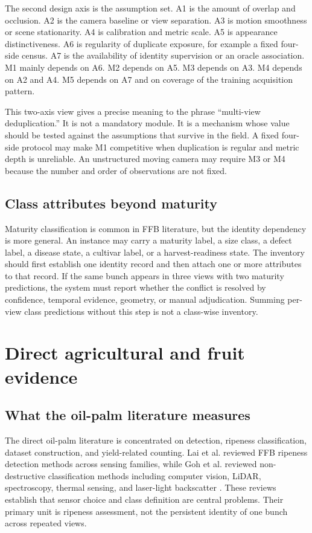 The second design axis is the assumption set. A1 is the amount of overlap and occlusion. A2 is the camera baseline or view separation. A3 is motion smoothness or scene stationarity. A4 is calibration and metric scale. A5 is appearance distinctiveness. A6 is regularity of duplicate exposure, for example a fixed four-side census. A7 is the availability of identity supervision or an oracle association. M1 mainly depends on A6. M2 depends on A5. M3 depends on A3. M4 depends on A2 and A4. M5 depends on A7 and on coverage of the training acquisition pattern.

This two-axis view gives a precise meaning to the phrase ``multi-view deduplication.'' It is not a mandatory module. It is a mechanism whose value should be tested against the assumptions that survive in the field. A fixed four-side protocol may make M1 competitive when duplication is regular and metric depth is unreliable. An unstructured moving camera may require M3 or M4 because the number and order of observations are not fixed.

\subsection{Class attributes beyond maturity}

Maturity classification is common in FFB literature, but the identity dependency is more general. An instance may carry a maturity label, a size class, a defect label, a disease state, a cultivar label, or a harvest-readiness state. The inventory should first establish one identity record and then attach one or more attributes to that record. If the same bunch appears in three views with two maturity predictions, the system must report whether the conflict is resolved by confidence, temporal evidence, geometry, or manual adjudication. Summing per-view class predictions without this step is not a class-wise inventory.

\section{Direct agricultural and fruit evidence}
\label{sec:direct2}

\subsection{What the oil-palm literature measures}

The direct oil-palm literature is concentrated on detection, ripeness classification, dataset construction, and yield-related counting. Lai et al. reviewed FFB ripeness detection methods across sensing families, while Goh et al. reviewed non-destructive classification methods including computer vision, LiDAR, spectroscopy, thermal sensing, and laser-light backscatter \cite{lai2023palmslr,goh2025palmreview}. These reviews establish that sensor choice and class definition are central problems. Their primary unit is ripeness assessment, not the persistent identity of one bunch across repeated views.

